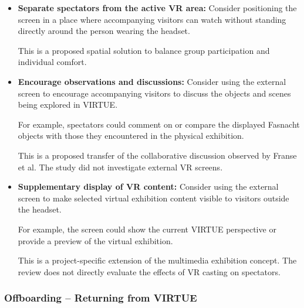 \begin{itemize}
    \item \textbf{Separate spectators from the active VR area:}
    Consider positioning the screen in a place where
    accompanying visitors can watch without standing
    directly around the person wearing the headset.

    This is a proposed spatial solution to balance
    group participation and individual comfort.
    \cite[p.~100]{whittaker_onboarding_2025}

    \item \textbf{Encourage observations and discussions:}
    Consider using the external screen to encourage
    accompanying visitors to discuss the objects and
    scenes being explored in VIRTUE.

    For example, spectators could comment on or compare
    the displayed Fasnacht objects with those they
    encountered in the physical exhibition.

    This is a proposed transfer of the collaborative
    discussion observed by Franse et al.
    The study did not investigate external VR screens.
    \cite[pp.~721--723]{franse_families_2021}

    \item \textbf{Supplementary display of VR content:}
    Consider using the external screen to make
    selected virtual exhibition content visible
    to visitors outside the headset.

    For example, the screen could show the
    current VIRTUE perspective or provide
    a preview of the virtual exhibition.

    This is a project-specific extension of
    the multimedia exhibition concept.
    The review does not directly evaluate
    the effects of VR casting on spectators.
    \cite[pp.~9--10]{zhou_meta-analytic_2022}

\end{itemize}


\subsubsection{Offboarding -- Returning from VIRTUE}

